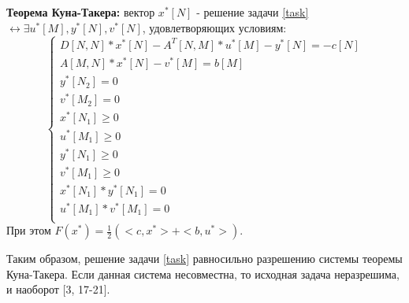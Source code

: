 \textbf{Теорема Куна-Такера:} вектор $x^*[N]$ - решение задачи \eqref{task} $\leftrightarrow \exists u^*[M],y^*[N],v^*[N]$, удовлетворяющих условиям:
\begin{equation}
    \left\{
    \begin{array}{ll}
        D[N,N]*x^*[N]-A^T[N,M]*u^*[M]-y^*[N]=-c[N]\\
        A[M,N]*x^*[N]-v^*[M]=b[M]\\
        y^*[N_2]=0\\
        v^*[M_2]=0\\
        x^*[N_1]\geq0\\
        u^*[M_1]\geq0\\
        y^*[N_1]\geq0\\
        v^*[M_1]\geq0\\
        x^*[N_1]*y^*[N_1]=0\\
        u^*[M_1]*v^*[M_1]=0\\
    \end{array}
    \right.
\end{equation}
При этом $F(x^*)=\frac{1}{2}(<c,x^*>+<b,u^*>)$.

Таким образом, решение задачи \eqref{task} равносильно разрешению системы теоремы Куна-Такера. Если данная система несовместна, то исходная задача неразрешима, и наоборот [3, 17-21].


